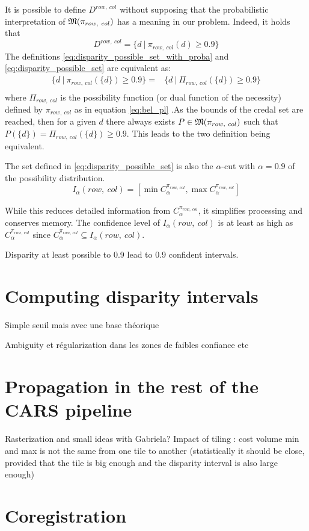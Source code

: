 It is possible to define \( D^{row,~col} \) without supposing that the probabilistic interpretation of \( {\mathfrak{M}}(\pi_{row,~col}) \) has a meaning in our problem. Indeed, it holds that 
\begin{equation}
    D^{row,~col}=\{ d~|~\pi_{row,~col}(d)\geqslant 0.9 \}\label{eq:disparity_possible_set}
\end{equation}
The definitions \eqref{eq:disparity_possible_set_with_proba} and \eqref{eq:disparity_possible_set} are equivalent as:
\begin{align*}
    \{ d~|~\pi_{row,~col}(\{d\})\geqslant 0.9 \} =& \{ d~|~\Pi_{row,~col}(\{d\})\geqslant 0.9 \}\\
\end{align*}
where \( \Pi_{row,~col} \) is the possibility function (or dual function of the necessity) defined by \( \pi_{row,~col} \) as in equation \eqref{eq:bel_pl} .As the bounds of the credal set are reached, then for a given \(d\) there always exists \(P\in{\mathfrak{M}}(\pi_{row,~col})\) such that \( P(\{d\}) = \Pi_{row,~col}(\{d\})\geqslant 0.9\). This leads to the two definition being equivalent.

The set defined in \eqref{eq:disparity_possible_set} is also the \(\alpha\)-cut with \(\alpha=0.9\) of the possibility distribution. 
\begin{equation}
    I_\alpha(row,~col) = [\min C^{\pi_{row,~col}}_\alpha, \max C^{\pi_{row,~col}}_\alpha] \label{eq:confidence_interval}
\end{equation}

While this reduces detailed information from \( C^{\pi_{row,~col}}_\alpha \), it simplifies processing and conserves memory. The confidence level of \( I_\alpha(row,~col) \) is at least as high as \( C^{\pi_{row,~col}}_\alpha \) since \( C^{\pi_{row,~col}}_\alpha \subseteq I_\alpha(row,~col) \). 

Disparity at least possible to 0.9 lead to 0.9 confident intervals. 

\section{Computing disparity intervals}
Simple seuil mais avec une base théorique

Ambiguity et régularization dans les zones de faibles confiance etc
\section{Propagation in the rest of the CARS pipeline}
Rasterization and small ideas with Gabriela?
Impact of tiling : cost volume min and max is not the same from one tile to another (statistically it should be close, provided that the tile is big enough and the disparity interval is also large enough)
\section{Coregistration}
\pagebreak